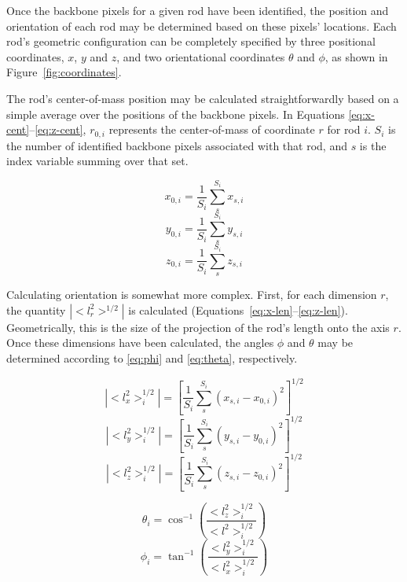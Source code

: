 Once the backbone pixels for a given rod have been identified, the position and orientation of each rod may
be determined based on these pixels' locations.  Each rod's geometric configuration can be
completely specified by three positional coordinates, $x$, $y$ and $z$, and two
orientational coordinates $\theta$ and $\phi$, as shown in Figure~\ref{fig:coordinates}.

The rod's center-of-mass position may be calculated
straightforwardly based on a simple average over the positions of the backbone pixels.  In 
Equations \ref{eq:x-cent}--\ref{eq:z-cent}, $r_{0,i}$ represents the center-of-mass of coordinate $r$ for 
rod $i$.  $S_i$ is the number of identified backbone pixels associated with that rod, and $s$ is the index
variable summing over that set.

\begin{equation}
\label{eq:x-cent}
x_{0,i} = \frac{1}{S_i} \sum_{s}^{S_i} x_{s,i}
\end{equation}
\begin{equation}
\label{eq:y-cent}
y_{0,i} = \frac{1}{S_i} \sum_{s}^{S_i} y_{s,i}
\end{equation}
\begin{equation}
\label{eq:z-cent}
z_{0,i} = \frac{1}{S_i} \sum_{s}^{S_i} z_{s,i} 
\end{equation}

Calculating orientation is somewhat more complex.  First, for each dimension $r$, the quantity
$|<l_r^2>^{1/2}|$ is calculated (Equations~\ref{eq:x-len}--\ref{eq:z-len}). 
Geometrically, this is the size of the projection of the rod's length
onto the axis $r$.
Once these dimensions have been calculated, the angles $\phi$ and $\theta$ may be 
determined according to \ref{eq:phi} and \ref{eq:theta}, respectively.

\begin{equation}
\label{eq:x-len}
|<l_x^2>_i^{1/2}| = \left[\frac{1}{S_i} \sum_s^{S_i} (x_{s,i} - x_{0,i} )^2 \right]^{1/2}
\end{equation}
\begin{equation}
\label{eq:y-len}
|<l_y^2>_i^{1/2}| = \left[\frac{1}{S_i} \sum_s^{S_i} (y_{s,i} - y_{0,i} )^2 \right]^{1/2}
\end{equation}
\begin{equation}
\label{eq:z-len}
|<l_z^2>_i^{1/2}| = \left[\frac{1}{S_i} \sum_s^{S_i} (z_{s,i} - z_{0,i} )^2 \right]^{1/2}
\end{equation}

\begin{equation}
\label{eq:theta}
\theta_i = \cos^{-1} \left(\frac{<l_z^2>_i^{1/2}}{<l^2>_i^{1/2}} \right)
\end{equation}
\begin{equation}
\label{eq:phi}
\phi_i = \tan^{-1} \left(\frac{<l_y^2>_i^{1/2}}{<l_x^2>_i^{1/2}} \right)
\end{equation}

